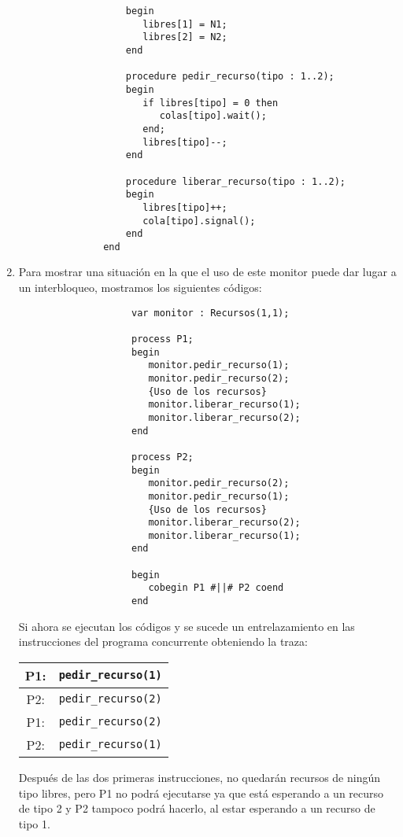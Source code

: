 \begin{ejercicio}
\begin{enumerate}
\begin{verbatim}
                   begin
                      libres[1] = N1;
                      libres[2] = N2;
                   end

                   procedure pedir_recurso(tipo : 1..2);
                   begin
                      if libres[tipo] = 0 then
                         colas[tipo].wait();
                      end;
                      libres[tipo]--;
                   end

                   procedure liberar_recurso(tipo : 1..2);
                   begin
                      libres[tipo]++;
                      cola[tipo].signal();
                   end
               end
            \end{verbatim}
        \item Para mostrar una situación en la que el uso de este monitor puede dar lugar a un interbloqueo, mostramos los siguientes códigos:
                \begin{verbatim}
                    var monitor : Recursos(1,1);

                    process P1;
                    begin
                       monitor.pedir_recurso(1);
                       monitor.pedir_recurso(2);
                       {Uso de los recursos}
                       monitor.liberar_recurso(1);
                       monitor.liberar_recurso(2);
                    end

                    process P2;
                    begin
                       monitor.pedir_recurso(2);
                       monitor.pedir_recurso(1);
                       {Uso de los recursos}
                       monitor.liberar_recurso(2);
                       monitor.liberar_recurso(1);
                    end

                    begin
                       cobegin P1 #||# P2 coend
                    end
                \end{verbatim}
                Si ahora se ejecutan los códigos y se sucede un entrelazamiento en las instrucciones del programa concurrente obteniendo la traza:
                \begin{table}[H]
                \centering
                \begin{tabular}{|cc|}
                    \hline 
                    P1: & \verb|pedir_recurso(1)| \\
                    \hline
                    P2: & \verb|pedir_recurso(2)| \\
                    \hline
                    P1: & \verb|pedir_recurso(2)| \\
                    \hline
                    P2: & \verb|pedir_recurso(1)| \\
                    \hline
                \end{tabular}
                \end{table}
                Después de las dos primeras instrucciones, no quedarán recursos de ningún tipo libres, pero P1 no podrá ejecutarse ya que está esperando a un recurso de tipo 2 y P2 tampoco podrá hacerlo, al estar esperando a un recurso de tipo 1.


\end{enumerate}
\end{ejercicio}
